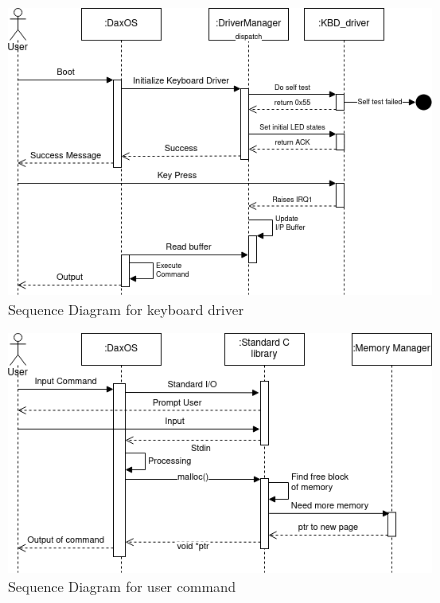 \begin{figure}[h!]
	\includegraphics[width=\textwidth,height=\textheight,keepaspectratio]{kbd_driver}
	\caption{Sequence Diagram for keyboard driver}
\end{figure}
\clearpage

\hspace{0pt}
\vfill
\begin{figure}[h!]
	\includegraphics[width=\textwidth,height=\textheight,keepaspectratio]{user_command}
	\caption{Sequence Diagram for user command}
\end{figure}
\hspace{0pt}
\vfill
\pagebreak
